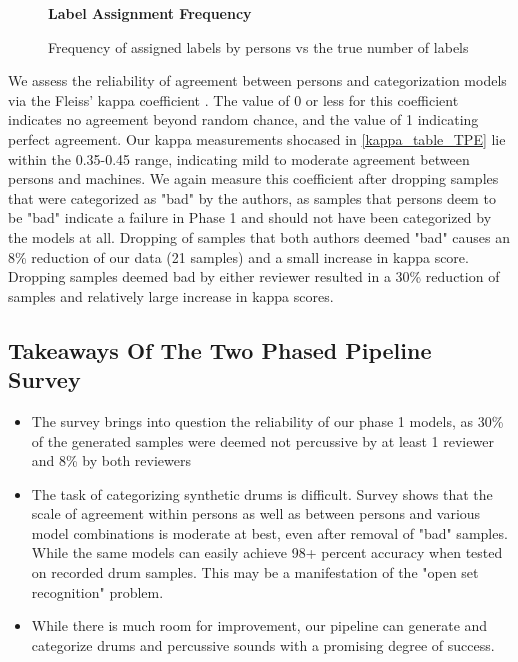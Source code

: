\documentclass[\main/thesis.tex]{subfiles}
\begin{document}
\begin{figure}[h!]
    \begin{center}
    \textbf{Label Assignment Frequency}
    \end{center}
    \caption{Frequency of assigned labels by persons vs the true number of labels}
\label{fig:freq-survey-2p}
\end{figure}
We assess the reliability of agreement between persons and categorization models via the Fleiss' kappa coefficient \cite{fleiss1971measuring}. The value of 0 or less for this coefficient indicates no agreement beyond random chance, and the value of 1 indicating perfect agreement. Our kappa measurements shocased in \ref{kappa_table_TPE} lie within the 0.35-0.45 range, indicating mild to moderate agreement between persons and machines. We again measure this coefficient after dropping samples that were categorized as "bad" by the authors, as samples that persons deem to be "bad" indicate a failure in Phase 1 and should not have been categorized by the models at all. Dropping of samples that both authors deemed "bad" causes an 8\% reduction of our data (21 samples) and a small increase in kappa score. Dropping samples deemed bad by either reviewer resulted in a 30\% reduction of samples and relatively large increase in kappa scores. 

\subsection{Takeaways Of The Two Phased Pipeline Survey}
\label{survey1_takeaway}
\begin{itemize}
    \item The survey brings into question the reliability of our phase 1 models, as 30\% of the generated samples were deemed not percussive by at least 1 reviewer and 8\% by both reviewers
    \item The task of categorizing synthetic drums is difficult. Survey shows that the scale of agreement within persons as well as between persons and various model combinations is moderate at best, even after removal of "bad" samples.  While the same models can easily achieve 98+ percent accuracy when tested on recorded drum samples. This may be a manifestation of the "open set recognition" problem. 
    \item While there is much room for improvement, our pipeline can generate and categorize drums and percussive sounds with a promising degree of success. 
\end{itemize}
\end{document}
